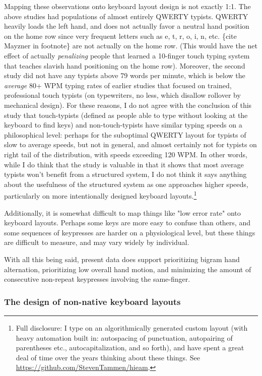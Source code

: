 \documentclass[11pt]{article}
\begin{document}
Mapping these observations onto keyboard layout design is not exactly 1:1. The above studies had populations of almost entirely QWERTY typists. QWERTY heavily loads the left hand, and does not actually favor a neutral hand position on the home row since very frequent letters such as e, t, r, o, i, n, etc. \{cite Mayzner in footnote\} are not actually on the home row. (This would have the net effect of actually \emph{penalizing} people that learned a 10-finger touch typing system that teaches slavish hand positioning on the home row). Moreover, the second study did not have any typists above 79 words per minute, which is below the \emph{average} 80+ WPM typing rates of earlier studies that focused on trained, professional touch typists (on typewriters, no less, which disallow rollover by mechanical design). For these reasons, I do not agree with the conclusion of this study that touch-typists (defined as people able to type without looking at the keyboard to find keys) and non-touch-typists have similar typing speeds on a philosophical level: perhaps for the suboptimal QWERTY layout for typists of slow to average speeds, but not in general, and almost certainly not for typists on right tail of the distribution, with speeds exceeding 120 WPM. In other words, while I do think that the study is valuable in that it shows that most average typists won't benefit from a structured system, I do not think it says anything about the usefulness of the structured system as one approaches higher speeds, particularly on more intentionally designed keyboard layouts.\footnote{Full disclosure: I type on an algorithmically generated custom layout (with heavy automation built in: autospacing of punctuation, autopairing of parentheses etc., autocapitalization, and so forth), and have spent a great deal of time over the years thinking about these things. See \url{https://github.com/StevenTammen/hieam}.}

Additionally, it is somewhat difficult to map things like "low error rate" onto keyboard layouts. Perhaps some keys are more easy to confuse than others, and some sequences of keypresses are harder on a physiological level, but these things are difficult to measure, and may vary widely by individual.

With all this being said, present data does support prioritizing bigram hand alternation, prioritizing low overall hand motion, and minimizing the amount of consecutive non-repeat keypresses involving the same-finger.

\subsubsection{The design of non-native keyboard layouts}
\label{sec:org10cc352}
\end{document}
